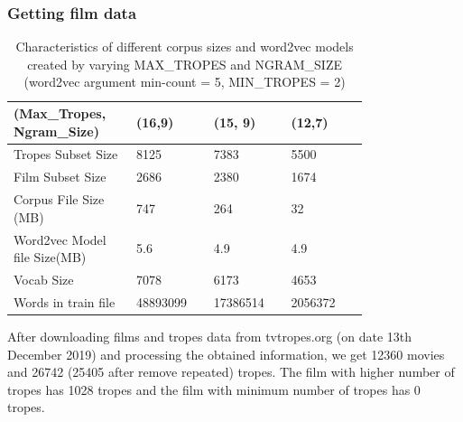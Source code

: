\documentclass[letterpaper]{article}
\begin{document}

    \subsubsection{Getting film data}
		
	\begin{table}[t]
		\centering
		\begin{tabular}{|p{0.24\linewidth}|p{0.18\linewidth}|p{0.18\linewidth}|p{0.18\linewidth}|}
			\hline
			\textbf{(Max\_Tropes, Ngram\_Size)}& \textbf{(16,9)} & \textbf{(15, 9)} & \textbf{(12,7)}\\
			\hline
			\hline
			Tropes Subset Size&8125&7383& 5500\\
			\hline
			Film Subset Size&2686&2380& 1674\\
			\hline
			Corpus File Size (MB)&747&264& 32\\
			\hline
			Word2vec Model file Size(MB)&5.6&4.9&4.9\\
			\hline
			Vocab Size& 7078 & 6173 & 4653\\
			\hline
			Words in train file& 48893099 &17386514&2056372\\
			\hline

		\end{tabular}
		\caption{Characteristics of different corpus sizes and word2vec models created by varying MAX\_TROPES and NGRAM\_SIZE (word2vec argument min-count = 5, MIN\_TROPES = 2)}
		\label{tab:corpusSize}
	\end{table}
	
	After downloading films and tropes data from tvtropes.org (on date 13th December 2019) and processing the obtained information, we get 12360 movies and 26742 (25405 after remove repeated) tropes. The film with higher number of tropes has 1028 tropes and the film with minimum number of tropes has 0 tropes.
	
\end{document}
